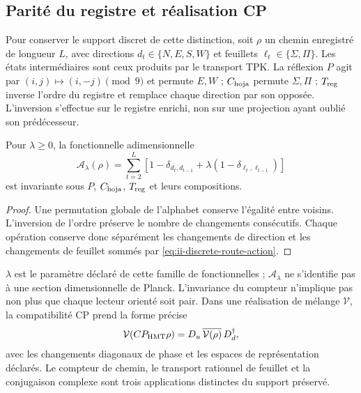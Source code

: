 \subsection{Parité du registre et réalisation CP}

Pour conserver le support discret de cette distinction, soit \(\rho\) un
chemin enregistré de longueur \(L\), avec directions
\(d_t\in\{N,E,S,W\}\) et feuillets \(\ell_t\in\{\Sigma,\Pi\}\).
Les états intermédiaires sont ceux produits par le transport TPK.
La réflexion \(P\) agit par \((i,j)\mapsto(i,-j)\pmod9\) et
permute \(E,W\) ; \(C_{\rm hoja}\) permute \(\Sigma,\Pi\) ;
\(T_{\rm reg}\) inverse l'ordre du registre et remplace chaque
direction par son opposée. L'inversion s'effectue sur le registre
enrichi, non sur une projection ayant oublié son prédécesseur.

\begin{proposition}
Pour \(\lambda\ge0\), la fonctionnelle adimensionnelle
\begin{equation}
 \mathcal A_\lambda(\rho)=
 \sum_{t=2}^{L}\left[1-\delta_{d_t,d_{t-1}}
             +\lambda(1-\delta_{\ell_t,\ell_{t-1}})\right]
 \label{eq:ii-discrete-route-action}
\end{equation}
est invariante sous \(P\), \(C_{\rm hoja}\), \(T_{\rm reg}\) et
leurs compositions.
\end{proposition}

\begin{proof}
Une permutation globale de l'alphabet conserve l'égalité entre voisins.
L'inversion de l'ordre préserve le nombre de changements consécutifs.
Chaque opération conserve donc séparément les changements de direction
et les changements de feuillet sommés par \eqref{eq:ii-discrete-route-action}.
\end{proof}

\(\lambda\) est le paramètre déclaré de cette famille de fonctionnelles ;
\(\mathcal A_\lambda\) ne s’identifie pas à une section dimensionnelle de
Planck. L’invariance du compteur n’implique pas non plus que chaque lecteur
orienté soit pair. Dans une réalisation de mélange \(\mathcal V\), la
compatibilité CP prend la forme précise
\begin{equation}
 \mathcal V(CP_{\rm HMT}\rho)
 =D_u\,\overline{\mathcal V(\rho)}\,D_d^\dagger,
 \label{eq:ii-cp-square}
\end{equation}
avec les changements diagonaux de phase et les espaces de représentation
déclarés. Le compteur de chemin, le transport rationnel de feuillet et la
conjugaison complexe sont trois applications distinctes du support préservé.

